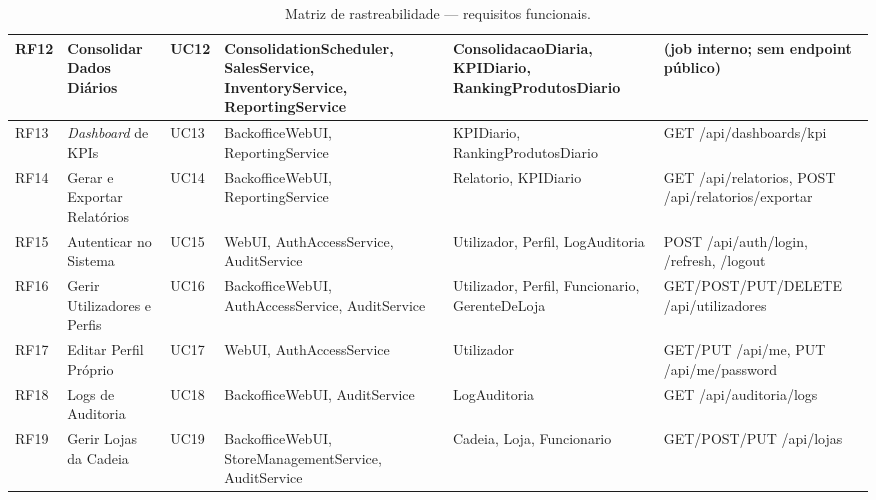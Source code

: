 \begin{table}[H]
\begin{tabular}{|p{0.7cm}|p{2.6cm}|p{0.6cm}|p{3.5cm}|p{2.8cm}|p{2.4cm}|}
\hline
RF12 & Consolidar Dados Diários & UC12 & ConsolidationScheduler, SalesService, InventoryService, ReportingService & ConsolidacaoDiaria, KPIDiario, RankingProdutosDiario & (job interno; sem endpoint público) \\
\hline
RF13 & \textit{Dashboard} de KPIs & UC13 & BackofficeWebUI, ReportingService & KPIDiario, RankingProdutosDiario & GET /api/dashboards/kpi \\
\hline
RF14 & Gerar e Exportar Relatórios & UC14 & BackofficeWebUI, ReportingService & Relatorio, KPIDiario & GET /api/relatorios, POST /api/relatorios/exportar \\
\hline
RF15 & Autenticar no Sistema & UC15 & WebUI, AuthAccessService, AuditService & Utilizador, Perfil, LogAuditoria & POST /api/auth/login, /refresh, /logout \\
\hline
RF16 & Gerir Utilizadores e Perfis & UC16 & BackofficeWebUI, AuthAccessService, AuditService & Utilizador, Perfil, Funcionario, GerenteDeLoja & GET/POST/PUT/DELETE /api/utilizadores \\
\hline
RF17 & Editar Perfil Próprio & UC17 & WebUI, AuthAccessService & Utilizador & GET/PUT /api/me, PUT /api/me/password \\
\hline
RF18 & Logs de Auditoria & UC18 & BackofficeWebUI, AuditService & LogAuditoria & GET /api/auditoria/logs \\
\hline
RF19 & Gerir Lojas da Cadeia & UC19 & BackofficeWebUI, StoreManagementService, AuditService & Cadeia, Loja, Funcionario & GET/POST/PUT /api/lojas \\
\hline
\end{tabular}
\caption{Matriz de rastreabilidade --- requisitos funcionais.}
\label{tab:rastreabilidade-rf}
\end{table}


